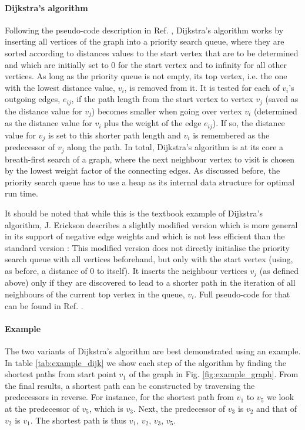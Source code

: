 \paragraph{Dijkstra's algorithm}
Following the pseudo-code description in Ref. \cite[p. 17]{FUH_algo_graphs_2021}, Dijkstra's algorithm
works by inserting all vertices of the graph into a priority search queue, where they are sorted according 
to distances values to the start vertex that are to be determined and which are initially set to $0$ for
the start vertex and to infinity for all other vertices.
As long as the priority queue is not empty, its top vertex, i.e. the one with the lowest distance value, 
$v_i$, is removed from it. 
It is tested for each of $v_i$'s outgoing edges, $e_{ij}$, if the path length from the start vertex to 
vertex $v_j$ (saved as the distance value for $v_j$) becomes smaller when going over vertex $v_i$ (determined
as the distance value for $v_i$ plus the weight of the edge $e_{ij}$). 
If so, the distance value for $v_j$ is set to this shorter path length and $v_i$ is remembered as the
predecessor of $v_j$ along the path.
In total, Dijkstra's algorithm is at its core a breath-first search of a graph, where the next neighbour 
vertex to visit is chosen by the lowest weight factor of the connecting edges.
As discussed before, the priority search queue has to use a heap as its internal data structure for
optimal run time.

It should be noted that while this is the textbook example of Dijkstra's algorithm, J. Erickson describes
a slightly modified version which is more general in its support of negative edge weights and which is not
less efficient than the standard version \cite[pp. 284-288]{Erickson2019}:
This modified version does not directly initialise the priority search queue with all vertices beforehand, 
but only with the start vertex (using, as before, a distance of $0$ to itself).
It inserts the neighbour vertices $v_j$ (as defined above) only if they are discovered to lead to a shorter 
path in the iteration of all neighbours of the current top vertex in the queue, $v_i$. Full pseudo-code 
for that can be found in Ref. \cite[p. 285]{Erickson2019}.

\paragraph{Example}
The two variants of Dijkstra's algorithm are best demonstrated using an example.
In table \ref{tab:example_dijk} we show each step of the algorithm by finding the shortest
paths from start point $v_1$ of the graph in Fig. \ref{fig:example_graph}.
From the final results, a shortest path can be constructed by traversing the predecessors in
reverse. For instance, for the shortest path from $v_1$ to $v_5$ we look at the predecessor
of $v_5$, which is $v_3$. Next, the predecessor of $v_3$ is $v_2$ and that of $v_2$ is $v_1$.
The shortest path is thus $v_1$, $v_2$, $v_3$, $v_5$.

